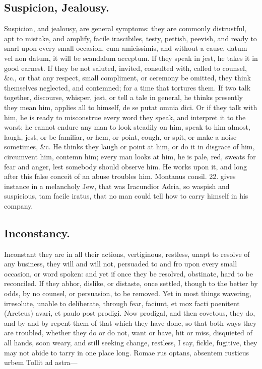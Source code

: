 {\subsection{Suspicion, Jealousy.}
Suspicion, and jealousy, are general symptoms:
they are commonly distrustful, apt to mistake, and amplify, facile
irascibiles, testy, pettish, peevish, and ready to snarl upon
every small occasion, cum amicissimis, and without a cause, datum
vel non datum, it will be scandalum acceptum. If they speak in jest, he
takes it in good earnest. If they be not saluted, invited, consulted
with, called to counsel, \&c., or that any respect, small compliment, or
ceremony be omitted, they think themselves neglected, and contemned;
for a time that tortures them. If two talk together, discourse,
whisper, jest, or tell a tale in general, he thinks presently they mean
him, applies all to himself, de se putat omnia dici. Or if they talk
with him, he is ready to misconstrue every word they speak, and
interpret it to the worst; he cannot endure any man to look steadily on
him, speak to him almost, laugh, jest, or be familiar, or hem, or
point, cough, or spit, or make a noise sometimes, \&c. He thinks
they laugh or point at him, or do it in disgrace of him, circumvent
him, contemn him; every man looks at him, he is pale, red, sweats for
fear and anger, lest somebody should observe him. He works upon it, and
long after this false conceit of an abuse troubles him. Montanus
consil. 22. gives instance in a melancholy Jew, that was Iracundior
Adria, so waspish and suspicious, tam facile iratus, that no man could
tell how to carry himself in his company.
\subsection{Inconstancy.}
Inconstant they are in all their actions, vertiginous,
restless, unapt to resolve of any business, they will and will not,
persuaded to and fro upon every small occasion, or word spoken: and yet
if once they be resolved, obstinate, hard to be reconciled. If they
abhor, dislike, or distaste, once settled, though to the better by
odds, by no counsel, or persuasion, to be removed. Yet in most things
wavering, irresolute, unable to deliberate, through fear, faciunt, et
mox facti poenitent (Areteus) avari, et paulo post prodigi. Now
prodigal, and then covetous, they do, and by-and-by repent them of that
which they have done, so that both ways they are troubled, whether they
do or do not, want or have, hit or miss, disquieted of all hands, soon
weary, and still seeking change, restless, I say, fickle, fugitive,
they may not abide to tarry in one place long.
Romae rus optans, absentem rusticus urbem
Tollit ad astra---

}
